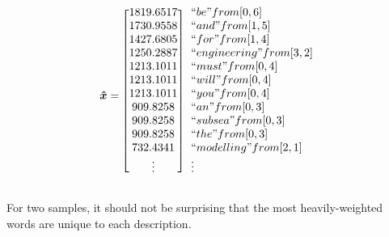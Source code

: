 \documentclass[12pt]{article}
\begin{document}
    \begin{equation*}
        \bm{\hat{x}} = 
        \begin{blockarray}{[c] l}
            1819.6517 & ``be" from [0, 6] \\
            1730.9558 & ``and" from [1, 5] \\
            1427.6805 & ``for" from [1, 4] \\
            1250.2887 & ``engineering" from [3, 2] \\
            1213.1011 & ``must" from [0, 4] \\
            1213.1011 & ``will" from [0, 4] \\
            1213.1011 & ``you" from [0, 4] \\
            909.8258 & ``an" from [0, 3] \\
            909.8258 & ``subsea" from [0, 3] \\
            909.8258 & ``the" from [0, 3] \\
            732.4341 & ``modelling" from [2, 1] \\
        \vdots & \vdots
        \end{blockarray}
    \end{equation*}

    For two samples, it should not be surprising that the most heavily-weighted
    words are unique to each description. 
    
    \begin{center} 
        
        
    \end{center}
    
\end{document}
